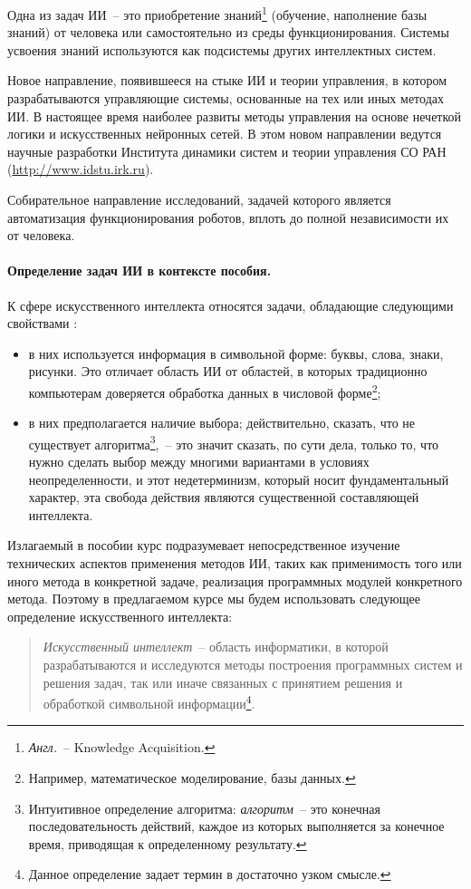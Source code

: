 \documentclass[a4paper,14pt, openany, twoside, draft]{extbook} %
\begin{document}
\begin{description}[style=unboxed,leftmargin=0,labelindent=\parindent]
 \item [Восприятие и усвоение знаний.] Одна из задач ИИ~-- это приобретение знаний\footnote{\emph{Англ.}~-- Knowledge Acquisition.} (обучение, наполнение базы знаний) от человека или самостоятельно из среды функционирования. Системы усвоения знаний используются как подсистемы других интеллектных систем.
 \item [Интеллектное управление \cite{Vass:2000}.] Новое направление, появившееся на стыке ИИ и теории управления, в котором разрабатываются управляющие системы, основанные на тех или иных методах ИИ. В настоящее время наиболее развиты методы управления на основе нечеткой логики и искусственных нейронных сетей. В этом новом направлении ведутся научные разработки Института динамики систем и теории управления СО РАН (\url{http://www.idstu.irk.ru}).
\item [Робототехника (Robotics).] Собирательное направление исследований, задачей которого является автоматизация функционирования роботов, вплоть до полной независимости их от человека.
\end{description}

\paragraph{Определение задач ИИ в контексте пособия.} К сфере искусственного интеллекта относятся задачи, обладающие следующими свойствами \cite{Lauriere}:
 \begin{itemize}
 \item в них используется информация в символьной форме: буквы, слова, знаки, рисунки. Это отличает область ИИ от областей, в которых традиционно компьютерам доверяется обработка данных в числовой форме\footnote{Например, математическое моделирование, базы данных.};
  \item в них предполагается наличие выбора; действительно, сказать, что не существует алгоритма\footnote{Интуитивное определение алгоритма: \emph{алгоритм}~-- это конечная последовательность действий, каждое из которых выполняется за конечное время, приводящая к определенному результату.},~-- это значит сказать, по сути дела, только то, что нужно сделать выбор между многими вариантами в условиях неопределенности, и этот недетерминизм, который носит фундаментальный характер, эта свобода действия являются существенной составляющей интеллекта.
 \end{itemize}

Излагаемый в пособии курс подразумевает непосредственное изучение технических аспектов применения методов ИИ, таких как применимость того или иного метода в конкретной задаче, реализация программных модулей конкретного метода. Поэтому в предлагаемом курсе мы будем использовать следующее определение искусственного интеллекта:
\begin{quote}{\em
Искусственный интеллект}~-- область информатики, в которой разрабатываются и исследуются методы построения программных систем и решения задач, так или иначе связанных с принятием решения и обработкой символьной информации\footnote{Данное определение задает термин в достаточно узком смысле.}.
\end{quote}
\end{document}
